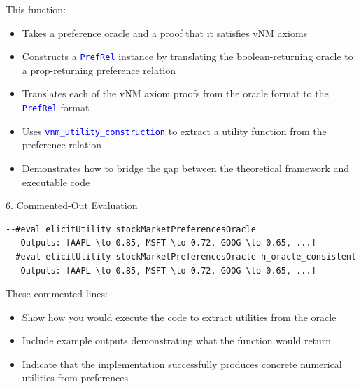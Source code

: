 \documentclass{article}
\theoremstyle{definition}
\newcommand{\tactic}[1]{\textcolor{blue}{\texttt{#1}}}
\begin{document}
This function:
\begin{itemize}
  \item Takes a preference oracle and a proof that it satisfies vNM axioms
  \item Constructs a \tactic{PrefRel} instance by translating the boolean-returning oracle to a prop-returning preference relation
  \item Translates each of the vNM axiom proofs from the oracle format to the \tactic{PrefRel} format
  \item Uses \tactic{vnm\_utility\_construction} to extract a utility function from the preference relation
  \item Demonstrates how to bridge the gap between the theoretical framework and executable code
\end{itemize}

6. Commented-Out Evaluation
\begin{lstlisting}
--#eval elicitUtility stockMarketPreferencesOracle
-- Outputs: [AAPL \to 0.85, MSFT \to 0.72, GOOG \to 0.65, ...]
--#eval elicitUtility stockMarketPreferencesOracle h_oracle_consistent
-- Outputs: [AAPL \to 0.85, MSFT \to 0.72, GOOG \to 0.65, ...]
\end{lstlisting}

These commented lines:
\begin{itemize}
  \item Show how you would execute the code to extract utilities from the oracle
  \item Include example outputs demonstrating what the function would return
  \item Indicate that the implementation successfully produces concrete numerical utilities from preferences
\end{itemize}
\end{document}
